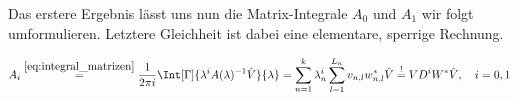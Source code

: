 Das erstere Ergebnis lässt uns nun die Matrix-Integrale $A_0$ und $A_1$ wir folgt umformulieren.
Letztere Gleichheit ist dabei eine elementare, sperrige Rechnung.

\begin{align} \label{eq:integral_matrizen_resultat_compact}
    A_i
    \stackrel{\eqref{eq:integral_matrizen}}{=}
    \frac{1}{2 \pi i}
    \Int[\Gamma]
    {
        \lambda^i
        A(\lambda)^{-1}
        \hat V
    }{\lambda}
    =
    \sum_{n=1}^k
        \lambda_n^i
        \sum_{l=1}^{L_n}
            v_{n, l} w_{n, l}^\ast
    \hat V
    \stackrel{!}{=}
    V D^i W^\ast \hat V,
    \quad
    i = 0, 1
\end{align}
